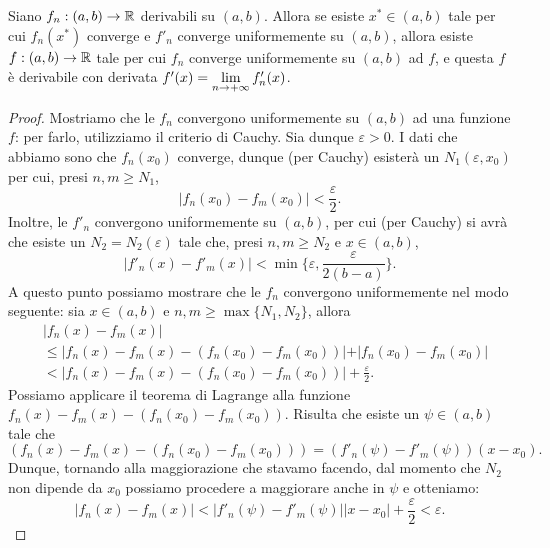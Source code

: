 \documentclass[Completo.tex]{subfiles}
\begin{document}
\begin{eTh}[derivabilita']
	Siano $f_n: (a,b) \ra \bb[R]$ derivabili su $(a,b)$. Allora se esiste $x^{*} \in (a,b)$ tale per cui $f_n(x^{*})$ converge e $f'_n$ converge uniformemente su $(a,b)$, allora esiste $f: (a,b) \ra \bb[R]$ tale per cui $f_n$ converge uniformemente su $(a,b)$ ad $f$, e questa $f$ è derivabile con derivata $f'(x) = \lim\limits_{n \rightarrow +\infty} f'_n(x)$.
\end{eTh}
\begin{proof}
	Mostriamo che le $f_n$ convergono uniformemente su $(a,b)$ ad una funzione $f$: per farlo, utilizziamo il criterio di Cauchy. Sia dunque $\varepsilon > 0$. I dati che abbiamo sono che $f_n(x_0)$ converge, dunque (per Cauchy) esisterà un $N_1(\varepsilon, x_0)$ per cui, presi $n, m \geq N_1$,
	\begin{equation*}
	\vert f_n(x_0) - f_m(x_0) \vert < \frac{\varepsilon}{2}.
	\end{equation*}
	Inoltre, le $f'_n$ convergono uniformemente su $(a,b)$, per cui (per Cauchy) si avrà che esiste un $N_2 = N_2(\varepsilon)$ tale che, presi $n, m \geq N_2$ e $x \in (a,b)$,
	\begin{equation*}
	\vert f'_n(x) - f'_m(x) \vert < \min\{\varepsilon, \frac{\varepsilon}{2(b-a)}\}.
	\end{equation*}
	A questo punto possiamo mostrare che le $f_n$ convergono uniformemente nel modo seguente: sia $x \in (a,b)$ e $n, m \geq \max\{N_1, N_2\}$, allora
	\begin{align*}
	&\vert f_n(x) - f_m(x) \vert\\
	& \leq \vert f_n(x) - f_m(x) - (f_n(x_0) - f_m(x_0)) \vert + \vert f_n(x_0) - f_m(x_0) \vert\\
	&< \vert f_n(x) - f_m(x) - (f_n(x_0) - f_m(x_0))\vert + \frac{\varepsilon}{2}.
	\end{align*}
	Possiamo applicare il teorema di Lagrange alla funzione $f_n(x) - f_m(x) - (f_n(x_0)-f_m(x_0))$. Risulta che esiste un $\psi \in (a,b)$ tale che
	\begin{equation*}
	(f_n(x) - f_m(x) - (f_n(x_0)-f_m(x_0))) = (f'_n(\psi) - f'_m(\psi))(x-x_0).
	\end{equation*}
	Dunque, tornando alla maggiorazione che stavamo facendo, dal momento che $N_2$ non dipende da $x_0$ possiamo procedere a maggiorare anche in $\psi$ e otteniamo:
	\begin{equation*}
	\vert f_n(x) - f_m(x) \vert < \vert f'_n(\psi) - f'_m(\psi) \vert \vert x - x_0 \vert + \frac{\varepsilon}{2} < \varepsilon.
	\end{equation*}

\end{proof}
\end{document}
